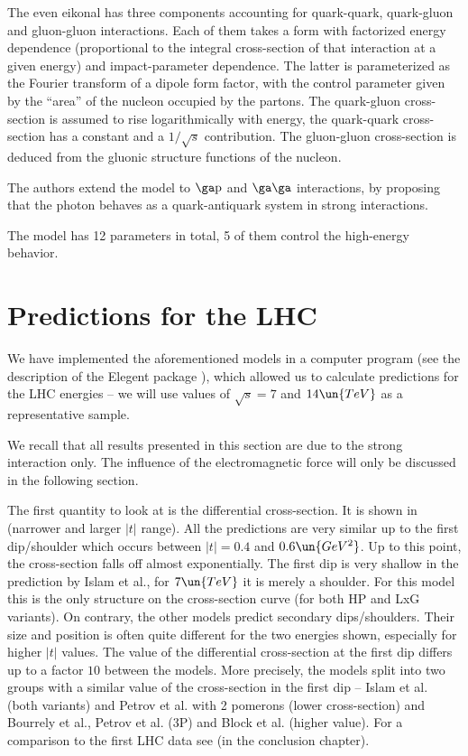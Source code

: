 The even eikonal has three components accounting for quark-quark, quark-gluon and gluon-gluon interactions. Each of them takes a form with factorized energy dependence (proportional to the integral cross-section of that interaction at a given energy) and impact-parameter dependence. The latter is parameterized as the Fourier transform of a dipole form factor, with the control parameter given by the ``area'' of the nucleon occupied by the partons. The quark-gluon cross-section is assumed to rise logarithmically with energy, the quark-quark cross-section has a constant and a $1/\sqrt s$ contribution. The gluon-gluon cross-section is deduced from the gluonic structure functions of the nucleon.

The authors extend the model to $\rm\ga p$ and $\rm\ga\ga$ interactions, by proposing that the photon behaves as a quark-antiquark system in strong interactions.

The model has 12 parameters in total, 5 of them control the high-energy behavior.

\section[el pred]{Predictions for the LHC}

We have implemented the aforementioned models in a computer program (see the description of the Elegent package ), which allowed us to calculate predictions for the LHC energies -- we will use values of $\sqrt s = 7$ and $14\un{TeV}$ as a representative sample.

We recall that all results presented in this section are due to the strong interaction only. The influence of the electromagnetic force will only be discussed in the following section.

The first quantity to look at is the differential cross-section. It is shown in  (narrower and larger $|t|$ range). All the predictions are very similar up to the first dip/shoulder which occurs between $|t| = 0.4$ and $0.6\un{GeV^2}$. Up to this point, the cross-section falls off almost exponentially. The first dip is very shallow in the prediction by Islam et al., for $7\un{TeV}$ it is merely a shoulder. For this model this is the only structure on the cross-section curve (for both HP and LxG variants). On contrary, the other models predict secondary dips/shoulders. Their size and position is often quite different for the two energies shown, especially for higher $|t|$ values. The value of the differential cross-section at the first dip differs up to a factor $10$ between the models. More precisely, the models split into two groups with a similar value of the cross-section in the first dip -- Islam et al. (both variants) and Petrov et al. with 2 pomerons (lower cross-section) and Bourrely et al., Petrov et al. (3P) and Block et al. (higher value). For a comparison to the first LHC data see  (in the conclusion chapter).

